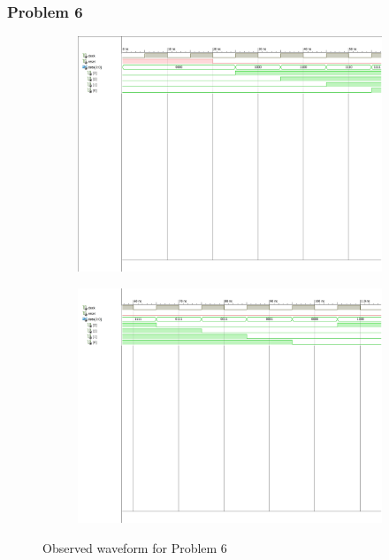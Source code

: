 \documentclass{lab_sheet}
\begin{document}
    \subsubsection*{Problem 6}
    \begin{figure}[H]
        \centering
        \begin{subfigure}{\linewidth}
            \includegraphics[width=.95\linewidth,  frame]{../Figures/6-1.pdf}
        \caption{}
        \label{fig:obs6-1}
        \end{subfigure}
        \begin{subfigure}{\linewidth}
            \includegraphics[width=.95\linewidth,  frame]{../Figures/6-2.pdf}
        \caption{}
        \label{fig:obs6-2}
        \end{subfigure}
        \caption{Observed waveform for Problem 6}
        \label{fig:obs6}
    \end{figure}
\end{document}

